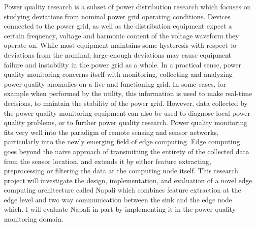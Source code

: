 Power quality research is a subset of power distribution research which focuses on studying  deviations from nominal power grid operating conditions. Devices connected to the power grid, as well as the distribution equipment expect a certain frequency, voltage and harmonic content of the voltage waveform they operate on. While most equipment maintains some hysteresis with respect to deviations from the nominal, large enough deviations may cause equipment failure and instability in the power grid as a whole. In a practical sense, power quality monitoring concerns itself with monitoring, collecting and analyzing power quality anomalies on a live and functioning grid. In some cases, for example when performed by the utility, this information is used to make real-time decisions, to maintain the stability of the power grid. However, data collected by the power quality monitoring equipment can also be used to diagnose local power quality problems, or to further power quality research. Power quality monitoring fits very well into the paradigm of remote sensing and sensor networks, particularly into the newly emerging field of edge computing. Edge computing goes beyond the naive approach of transmitting the entirety of the collected data from the sensor location, and extends it by either feature extracting, preprocessing or filtering the data at the computing node itself. This research project will investigate the design, implementation, and evaluation of a novel edge computing architecture called Napali which combines feature extraction at the edge level and two way communication between the sink and the edge node which. I will evaluate Napali in part by implementing it in the power quality monitoring domain.

